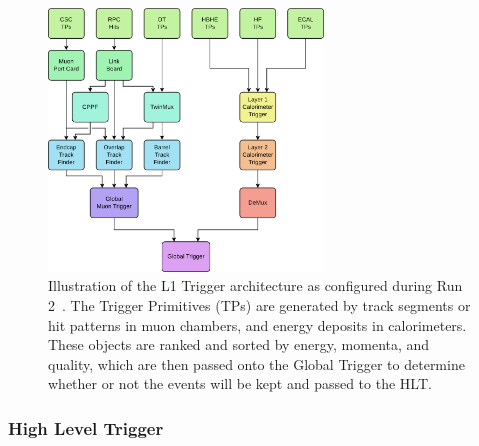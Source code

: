 \begin{figure}[htbp]
  \centering
  \includegraphics[width=0.65\textwidth]{fig/experiment/cms_L1trigger.pdf}
  \caption[
    Illustration of the L1 Trigger architecture as configured during Run 2.
    The Trigger Primitives (TPs) are generated by track segments or hit patterns in muon chambers, and energy deposits in calorimeters.
    These objects are ranked and sorted by energy, momenta, and quality, which are then passed onto the Global Trigger to determine whether or not the events will be kept and passed to the HLT.
  ]{
    Illustration of the L1 Trigger architecture as configured during Run 2~\cite{cmscollaboration2020performance}.
    The Trigger Primitives (TPs) are generated by track segments or hit patterns in muon chambers, and energy deposits in calorimeters.
    These objects are ranked and sorted by energy, momenta, and quality, which are then passed onto the Global Trigger to determine whether or not the events will be kept and passed to the HLT.
  }
  \label{fig:L1Trigger}
\end{figure}

\subsubsection{High Level Trigger}

